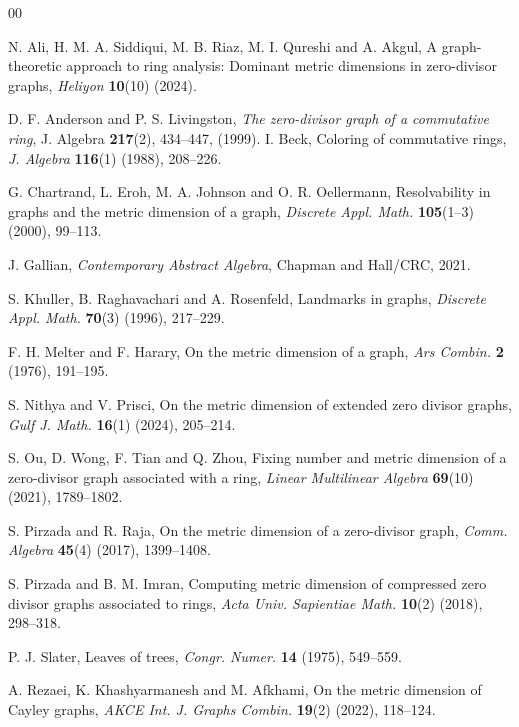 \documentclass[12pt]{article}
\begin{document}
\begin{thebibliography}{00}
	
	N. Ali, H. M. A. Siddiqui, M. B. Riaz, M. I. Qureshi and A. Akgul, A graph-theoretic approach to ring analysis: Dominant metric dimensions in zero-divisor graphs, \textit{Heliyon} \textbf{10}(10) (2024).
	
	D. F. Anderson and P. S. Livingston, \textit{The zero-divisor graph of a commutative ring}, J. Algebra \textbf{217}(2), 434--447, (1999).
	I. Beck, Coloring of commutative rings, \textit{J. Algebra} \textbf{116}(1) (1988), 208--226.
	
	G. Chartrand, L. Eroh, M. A. Johnson and O. R. Oellermann, Resolvability in graphs and the metric dimension of a graph, \textit{Discrete Appl. Math.} \textbf{105}(1--3) (2000), 99--113.
	
	J. Gallian, \textit{Contemporary Abstract Algebra}, Chapman and Hall/CRC, 2021.
	
	S. Khuller, B. Raghavachari and A. Rosenfeld, Landmarks in graphs, \textit{Discrete Appl. Math.} \textbf{70}(3) (1996), 217--229.
	
	F. H. Melter and F. Harary, On the metric dimension of a graph, \textit{Ars Combin.} \textbf{2} (1976), 191--195.
	
	S. Nithya and V. Prisci, On the metric dimension of extended zero divisor graphs, \textit{Gulf J. Math.} \textbf{16}(1) (2024), 205--214.
	
	S. Ou, D. Wong, F. Tian and Q. Zhou, Fixing number and metric dimension of a zero-divisor graph associated with a ring, \textit{Linear Multilinear Algebra} \textbf{69}(10) (2021), 1789--1802.
	
	S. Pirzada and R. Raja, On the metric dimension of a zero-divisor graph, \textit{Comm. Algebra} \textbf{45}(4) (2017), 1399--1408.
	
	S. Pirzada and B. M. Imran, Computing metric dimension of compressed zero divisor graphs associated to rings, \textit{Acta Univ. Sapientiae Math.} \textbf{10}(2) (2018), 298--318.
	
	P. J. Slater, Leaves of trees, \textit{Congr. Numer.} \textbf{14} (1975), 549--559.
	
	A. Rezaei, K. Khashyarmanesh and M. Afkhami, On the metric dimension of Cayley graphs, \textit{AKCE Int. J. Graphs Combin.} \textbf{19}(2) (2022), 118--124.
	

\end{thebibliography}
\end{document}
